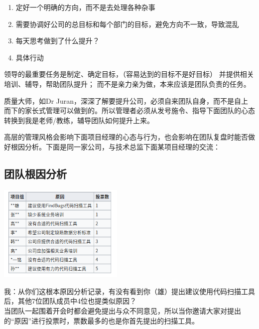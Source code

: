 \begin{enumerate}
\tightlist
\item
  定好一个明确的方向，而不是去处理各种杂事
\item
  需要协调好公司的总目标和每个部门的目标，避免方向不一致，导致混乱
\item
  每天思考做到了什么提升？
\item
  具体行动
\end{enumerate}

\begin{description}
\item[]
\begin{description}
\tightlist
\item[]
= = = = =
\end{description}
\end{description}

领导的最重要任务是制定、确定目标，（容易达到的目标不是好目标）
并提供相关培训、辅导，帮助团队提升；
而不是亲力亲为做，本来应该是团队负责的任务。

质量大师，如Dr
Juran，深深了解要提升公司，必须自来团队自身，而不是自上而下的家长式管理可以做到的。所以管理者必须从发号施令、指导下面团队的心态转换到我是老师/教练，辅导团队如何提升上来。

高层的管理风格会影响下面项目经理的心态与行为，也会影响在团队复盘时能否做好根因分析。下面是同一家公司，与技术总监下面某项目经理的交流：

\hypertarget{ux56e2ux961fux6839ux56e0ux5206ux6790}{%
\subsection{团队根因分析}\label{ux56e2ux961fux6839ux56e0ux5206ux6790}}

\includegraphics[width=6cm]{Screenshotfrom2022-12-2820-57-58.png}

我：从你们这根本原因分析记录，有没有看到你（雄）提出建议使用代码扫描工具后，其他7位团队成员中4位也提类似原因？\\
当团队一起围着开会时都会避免提出与众不同意见，所以当你邀请大家对提出的``原因''进行投票时，票数最多的也是你首先提出的扫描工具。

